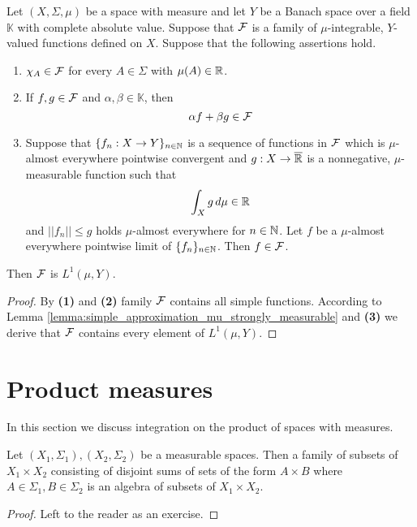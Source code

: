 \begin{corollary}\label{corollary:measurable_induction_for_banach_valued}
Let $(X,\Sigma,\mu)$ be a space with measure and let $Y$ be a Banach space over a field $\mathbb{K}$ with complete absolute value. Suppose that ${\mathcal F}$ is a family of $\mu$-integrable, $Y$-valued functions defined on $X$. Suppose that the following assertions hold.
\begin{enumerate}[label=\emph{\textbf{(\arabic*)}}, leftmargin=*]
\item $\chi_A\in {\mathcal F}$ for every $A\in \Sigma$ with $\mu(A)\in {\mathbb R}$.
\item If $f, g\in {\mathcal F}$ and $\alpha, \beta\in \mathbb{K}$, then
$$\alpha f + \beta g\in {\mathcal F}$$
\item Suppose that $\{f_n:X\rightarrow Y\}_{n\in {\mathbb N}}$ is a sequence of functions in ${\mathcal F}$ which is $\mu$-almost everywhere pointwise convergent and $g:X\rightarrow \overline{{\mathbb R}}$ is a nonnegative, $\mu$-measurable function such that
$$\int_Xg\,d\mu \in {\mathbb R}$$
and $||f_n||\leq g$ holds $\mu$-almost everywhere for $n\in {\mathbb N}$. Let $f$ be a $\mu$-almost everywhere pointwise limit of $\{f_n\}_{n\in {\mathbb N}}$. Then $f\in {\mathcal F}$.
\end{enumerate}
Then ${\mathcal F}$ is $L^1(\mu,Y)$.
\end{corollary}
\begin{proof}
By \textbf{(1)} and \textbf{(2)} family ${\mathcal F}$ contains all simple functions. According to Lemma \ref{lemma:simple_approximation_mu_strongly_measurable} and \textbf{(3)} we derive that ${\mathcal F}$ contains every element of $L^1(\mu,Y)$.
\end{proof}

\section{Product measures}
\noindent
In this section we discuss integration on the product of spaces with measures.

\begin{fact}\label{fact:productalgebra}
Let $(X_1,\Sigma_1), (X_2,\Sigma_2)$ be a measurable spaces. Then a family of subsets of $X_1\times X_2$ consisting of disjoint sums of sets of the form $A\times B$ where $A\in \Sigma_1, B\in \Sigma_2$ is an algebra of subsets of $X_1\times X_2$.
\end{fact}
\begin{proof}
Left to the reader as an exercise.
\end{proof}

